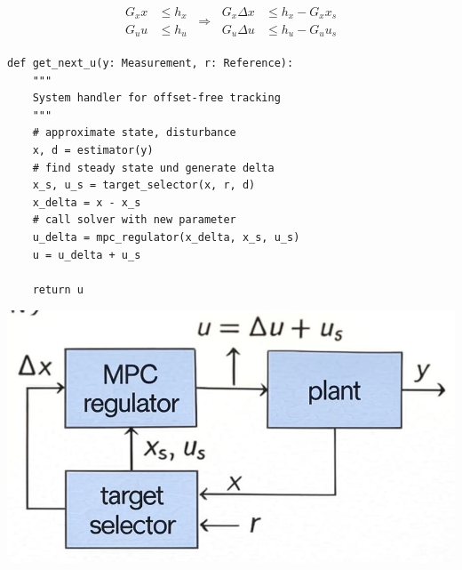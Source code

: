 

\begin{align*}
	\begin{aligned}
		G_x  x & \leq h_x \\
		G_u  u & \leq h_u
	\end{aligned}
	\ \Rightarrow \
	\begin{aligned}
		G_x \Delta x & \leq h_x - G_x x_s \\
		G_u \Delta u & \leq h_u - G_u u_s
	\end{aligned}
\end{align*}


\begin{lstlisting}[style=sst]
def get_next_u(y: Measurement, r: Reference):
    """
    System handler for offset-free tracking
    """
    # approximate state, disturbance
    x, d = estimator(y)
    # find steady state und generate delta
    x_s, u_s = target_selector(x, r, d)
    x_delta = x - x_s
    # call solver with new parameter
    u_delta = mpc_regulator(x_delta, x_s, u_s)
    u = u_delta + u_s

    return u
\end{lstlisting}
\includegraphics[width=\columnwidth]{images/tracking-system-diagram.jpg}
%

